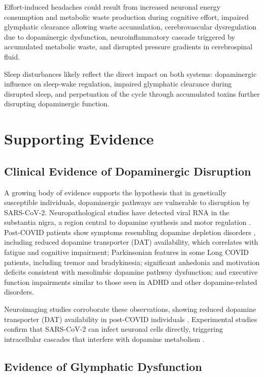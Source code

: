 \documentclass[12pt]{article}
\begin{document}
Effort-induced headaches could result from increased neuronal energy consumption and metabolic waste production during cognitive effort, impaired glymphatic clearance allowing waste accumulation, cerebrovascular dysregulation due to dopaminergic dysfunction, neuroinflammatory cascade triggered by accumulated metabolic waste, and disrupted pressure gradients in cerebrospinal fluid.

Sleep disturbances likely reflect the direct impact on both systems: dopaminergic influence on sleep-wake regulation, impaired glymphatic clearance during disrupted sleep, and perpetuation of the cycle through accumulated toxins further disrupting dopaminergic function.

\section{Supporting Evidence}

\subsection*{Clinical Evidence of Dopaminergic Disruption}

A growing body of evidence supports the hypothesis that in genetically susceptible individuals, dopaminergic pathways are vulnerable to disruption by SARS-CoV-2. Neuropathological studies have detected viral RNA in the substantia nigra, a region central to dopamine synthesis and motor regulation \citep{song2021neuroinvasion}. Post-COVID patients show symptoms resembling dopamine depletion disorders \citep{brundin2020parkinsonmanagement, devine2022parkinsonscovid}, including reduced dopamine transporter (DAT) availability, which correlates with fatigue and cognitive impairment; Parkinsonian features in some Long COVID patients, including tremor and bradykinesia; significant anhedonia and motivation deficits consistent with mesolimbic dopamine pathway dysfunction; and executive function impairments similar to those seen in ADHD and other dopamine-related disorders.

Neuroimaging studies corroborate these observations, showing reduced dopamine transporter (DAT) availability in post-COVID individuals \citep{lee2024dopamineinfection}. Experimental studies confirm that SARS-CoV-2 can infect neuronal cells directly, triggering intracellular cascades that interfere with dopamine metabolism \citep{cappelletti2023dopamineblock}.

\subsection*{Evidence of Glymphatic Dysfunction}
\end{document}
